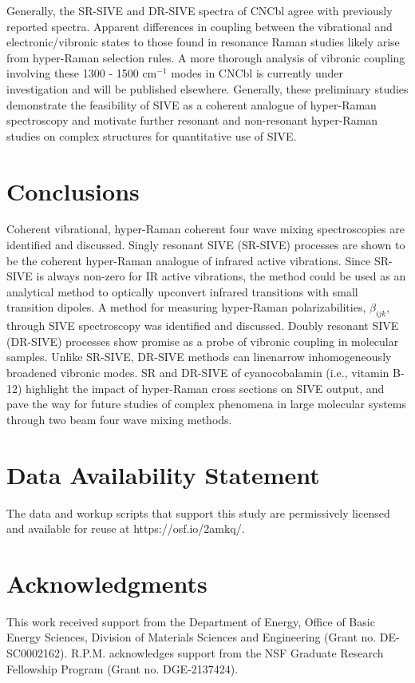\documentclass[aip, jcp, reprint, twocolumn]{revtex4-2}
\begin{document}
Generally, the SR-SIVE and DR-SIVE spectra of CNCbl agree with previously reported spectra.
Apparent differences in coupling between the vibrational and electronic/vibronic states to those found in resonance Raman studies likely arise from hyper-Raman selection rules. 
A more thorough analysis of vibronic coupling involving these 1300 - 1500 cm$^{-1}$ modes in CNCbl is currently under investigation and will be published elsewhere. \cite{Kaufman2024_1}
Generally, these preliminary studies demonstrate the feasibility of SIVE as a coherent analogue of hyper-Raman spectroscopy and motivate further resonant and non-resonant hyper-Raman studies on complex structures for quantitative use of SIVE.\cite{MyersKelley2008}

\section{Conclusions}
Coherent vibrational, hyper-Raman coherent four wave mixing spectroscopies are identified and discussed.
Singly resonant SIVE (SR-SIVE) processes are shown to be the coherent hyper-Raman analogue of infrared active vibrations.
Since SR-SIVE is always non-zero for IR active vibrations, the method could be used as an analytical method to optically upconvert infrared transitions with small transition dipoles.
A method for measuring hyper-Raman polarizabilities, $\beta_{ijk}$, through SIVE spectroscopy was identified and discussed.
Doubly resonant SIVE (DR-SIVE) processes show promise as a probe of vibronic coupling in molecular samples.
Unlike SR-SIVE, DR-SIVE methods can linenarrow inhomogeneously broadened vibronic modes. 
SR and DR-SIVE of cyanocobalamin (i.e., vitamin B-12) highlight the impact of hyper-Raman cross sections on SIVE output, and pave the way for future studies of complex phenomena in large molecular systems through two beam four wave mixing methods.

\section{Data Availability Statement}
The data and workup scripts that support this study are permissively licensed and available for reuse at https://osf.io/2amkq/. 

\section{Acknowledgments}
This work received support from the Department of Energy, Office of Basic Energy Sciences, Division of Materials Sciences and Engineering (Grant no. DE-SC0002162).
R.P.M. acknowledges support from the NSF Graduate Research Fellowship Program (Grant no. DGE-2137424). 
\end{document}

